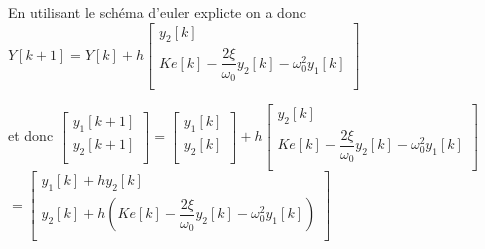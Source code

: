 En utilisant le schéma d'euler explicte on a donc $Y[k+1] = Y[k]+h
\left[
\begin{array}{l}
y_2[k] \\
Ke[k] - \dfrac{2\xi}{\omega_0} y_2[k]- \omega_0^2 y_1[k] \\
\end{array}
\right]$

et donc 
$
\left[
\begin{array}{l}
y_1[k+1] \\
y_2[k+1] \\
\end{array}
\right]
=\left[
\begin{array}{l}
y_1[k] \\
y_2[k] \\
\end{array}
\right]
+
h
\left[
\begin{array}{l}
y_2[k] \\
Ke[k] - \dfrac{2\xi}{\omega_0} y_2[k]- \omega_0^2 y_1[k] \\
\end{array}
\right]
$
$=
\left[
\begin{array}{l}
y_1[k]+hy_2[k] \\
y_2[k]+h\left(Ke[k] - \dfrac{2\xi}{\omega_0} y_2[k]- \omega_0^2 y_1[k] \right)\\
\end{array}
\right]
$
